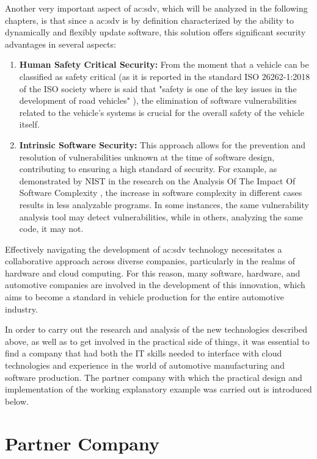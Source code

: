 Another very important aspect of \gls{ac:sdv}, which will be analyzed in the following chapters, is that since a \gls{ac:sdv} is by definition characterized by the ability to dynamically and flexibly update software, this solution offers significant security advantages in several aspects:
\begin{enumerate}
  \item \textbf{Human Safety Critical Security:} From the moment that a vehicle can be classified as safety critical (as it is reported in the standard ISO 26262-1:2018 of the ISO society where is said that "safety is one of the key issues in the development of road vehicles" \cite{ISO26262}), the elimination of software vulnerabilities related to the vehicle's systems is crucial for the overall safety of the vehicle itself.  
  \item \textbf{Intrinsic Software Security:} This approach allows for the prevention and resolution of vulnerabilities unknown at the time of software design, contributing to ensuring a high standard of security. For example, as demonstrated by NIST in the research on the Analysis Of The Impact Of Software Complexity \cite{NISTCodeComplexity}, the increase in software complexity in different cases results in less analyzable programs. In some instances, the same vulnerability analysis tool may detect vulnerabilities, while in others, analyzing the same code, it may not. 
\end{enumerate}

Effectively navigating the development of \gls{ac:sdv} technology necessitates a collaborative approach across diverse companies, particularly in the realms of hardware and cloud computing. For this reason, many software, hardware, and automotive companies are involved in the development of this innovation, which aims to become a standard in vehicle production for the entire automotive industry.

In order to carry out the research and analysis of the new technologies described above, as well as to get involved in the practical side of things, it was essential to find a company that had both the IT skills needed to interface with cloud technologies and experience in the world of automotive manufacturing and software production. The partner company with which the practical design and implementation of the working explanatory example was carried out is introduced below.
\section{Partner Company}

